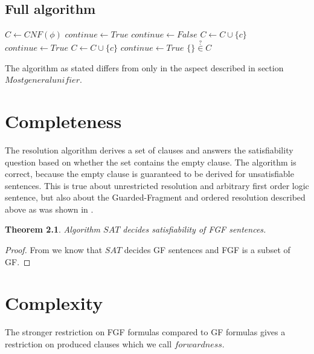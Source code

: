 \documentclass[english, shortabstract]{iithesis}
\theoremstyle{definition} \newtheorem{definition}{Definition}[chapter]
\theoremstyle{remark} \newtheorem{remark}[definition]{Observation}
\theoremstyle{plain} \newtheorem{theorem}[definition]{Theorem}
\theoremstyle{plain} \newtheorem{lemma}[definition]{Lemma}
\begin{document}
\section{Full algorithm}

\begin{algorithm}
\begin{algorithmic}
\State $C \gets CNF(\phi)$
\State $continue \gets True$
\State $continue \gets False$
    \State $C \gets C \cup \{c\}$
    \State $continue \gets True$
\EndIf
{}
    \State $C \gets C \cup \{c\}$
    \State $continue \gets True$
\EndIf
\EndFor
\EndWhile
\State
\Return $\{\} \stackrel{?}{\in} C$
\EndProcedure
\end{algorithmic}
\end{algorithm}

The algorithm as stated differs from \cite{resolution GF} only in the aspect described in section $\mathit{Most general unifier}$.

\chapter{Completeness}

The resolution algorithm derives a set of clauses and answers the satisfiability question 
based on whether the set contains the empty clause. The algorithm is correct, because 
the empty clause is guaranteed to be derived for unsatisfiable sentences.
This is true about unrestricted resolution and arbitrary first order logic sentence, 
but also about the Guarded-Fragment and ordered resolution described above as was shown in \cite{resolution gf}.

\begin{theorem}
Algorithm $SAT$ decides satisfiability of FGF sentences.
\end{theorem}

\begin{proof}
From \cite{resolution gf} we know that $SAT$ decides GF sentences and FGF is a subset of GF.
\end{proof}

\chapter{Complexity}

The stronger restriction on FGF formulas compared to GF formulas gives a restriction on produced clauses which we call $forwardness$.
\end{document}
